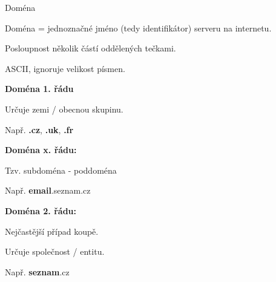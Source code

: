 \documentclass[aspectratio=169]{beamer}
\begin{document}
\begin{frame}{Doména}
    \begin{cardTiny}
        \begin{flushleft}
        Doména = jednoznačné jméno (tedy identifikátor) serveru na internetu.

        Posloupnost několik částí oddělených tečkami.

        ASCII, ignoruje velikost písmen. 
        \end{flushleft}
    \end{cardTiny}
    
    \begin{multicols}{2}
        \centering
        
        \begin{cardTiny}
            \textbf{Doména 1. řádu}
        
            \begin{flushleft}
                Určuje zemi / obecnou skupinu.

                Např. \textbf{.cz}, \textbf{.uk}, \textbf{.fr}
            \end{flushleft}
        \end{cardTiny}

        \begin{cardTiny}
            \textbf{Doména x. řádu:}
            
            \begin{flushleft}
            Tzv. subdoména - poddoména

            Např. \textbf{email}.seznam.cz
            \end{flushleft}
        \end{cardTiny}
        
        \begin{cardTiny}
            \textbf{Doména 2. řádu:}
            
            \begin{flushleft}
            Nejčastější případ koupě.

            Určuje společnost / entitu.

            Např. \textbf{seznam}.cz
            \end{flushleft}
        \end{cardTiny}
    \end{multicols}
\end{frame}
\end{document}
